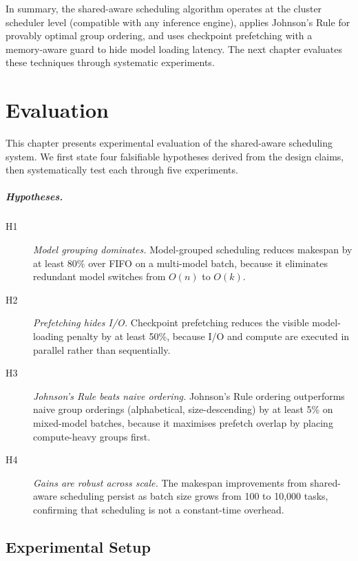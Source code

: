 \documentclass[logo,bsc,singlespacing,parskip,online]{infthesis}
\begin{document}
In summary, the shared-aware scheduling algorithm operates at the cluster scheduler level (compatible with any inference engine), applies Johnson's Rule for provably optimal group ordering, and uses checkpoint prefetching with a memory-aware guard to hide model loading latency. The next chapter evaluates these techniques through systematic experiments.



\chapter{Evaluation}

This chapter presents experimental evaluation of the shared-aware scheduling system. We first state four falsifiable hypotheses derived from the design claims, then systematically test each through five experiments.

\paragraph{Hypotheses.}
\begin{description}
\item[H1] \textit{Model grouping dominates.} Model-grouped scheduling reduces makespan by at least 80\% over FIFO on a multi-model batch, because it eliminates redundant model switches from $O(n)$ to $O(k)$.
\item[H2] \textit{Prefetching hides I/O.} Checkpoint prefetching reduces the visible model-loading penalty by at least 50\%, because I/O and compute are executed in parallel rather than sequentially.
\item[H3] \textit{Johnson's Rule beats naive ordering.} Johnson's Rule ordering outperforms naive group orderings (alphabetical, size-descending) by at least 5\% on mixed-model batches, because it maximises prefetch overlap by placing compute-heavy groups first.
\item[H4] \textit{Gains are robust across scale.} The makespan improvements from shared-aware scheduling persist as batch size grows from 100 to 10,000 tasks, confirming that scheduling is not a constant-time overhead.
\end{description}


\section{Experimental Setup}
\end{document}
